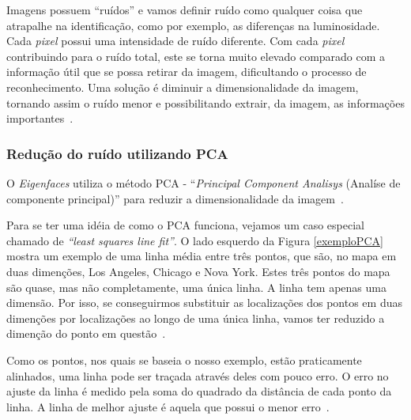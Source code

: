 Imagens possuem ``ruídos'' e vamos definir ruído como qualquer coisa que atrapalhe na identificação, como por exemplo, as diferenças na luminosidade. Cada \textit{pixel} possui uma intensidade de ruído diferente. Com cada \textit{pixel} contribuindo para o ruído total, este se torna muito elevado comparado com a informação útil que se possa retirar da imagem, dificultando o processo de reconhecimento. Uma solução é diminuir a dimensionalidade da imagem, tornando assim o ruído menor e possibilitando extrair, da imagem, as informações importantes~\cite{hewitt}.

\subsubsection{Redução do ruído utilizando PCA}

O \textit{Eigenfaces} utiliza o método PCA - ``\textit{Principal Component Analisys} (Analíse de componente principal)'' para reduzir a dimensionalidade da imagem~\cite{hewitt}.

Para se ter uma idéia de como o PCA funciona, vejamos um caso especial chamado de \textit{``least squares line fit''}. O lado esquerdo da Figura \ref{exemploPCA} mostra um exemplo de uma linha média entre três pontos, que são, no mapa em duas dimenções, Los Angeles, Chicago e Nova York. Estes três pontos do mapa são quase, mas não completamente, uma única linha. A linha tem apenas uma dimensão. Por isso, se conseguirmos substituir as localizações dos pontos em duas dimenções por localizações ao longo de uma única linha, vamos ter reduzido a dimenção do ponto em questão~\cite{hewitt}.

Como os pontos, nos quais se baseia o nosso exemplo, estão praticamente alinhados, uma linha pode ser traçada através deles com pouco erro. O erro no ajuste da linha é medido pela soma do quadrado da distância de cada ponto da linha. A linha de melhor ajuste é aquela que possui o menor erro~\cite{hewitt}.

